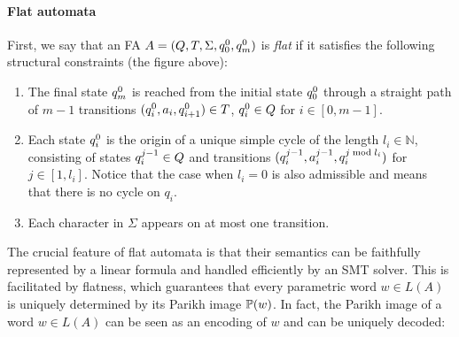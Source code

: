 \documentclass[sigplan,review,anonymous]{acmart}\settopmatter{printfolios=true,printccs=false,printacmref=false}
\begin{document}
\paragraph{Flat automata} 
First, we say that an FA 
$A = (Q,T,\Sigma,q_{0}^{0},q_{m}^{0})$ is \emph{flat} if it satisfies the following structural constraints (the figure above):
\begin{enumerate}
	\item The final state $q_{m}^{0}$ is reached from  the initial state $q_{0}^{0}$ through a straight path of $m-1$ transitions $(q_{i}^{0},a_i,q_{i+1}^{0}) \in T$, $q_{i}^{0} \in Q$ for $i\in[0,m-1]$. 
	\item  
Each state $q_{i}^{0}$ is the origin of a unique simple cycle of the length $l_i\in\mathbb{N}$, consisting of states $q_{i}^{j-1} \in Q$ and transitions $(q_{i}^{j-1}, a_{i}^{j-1}, q_{i}^{j \bmod l_i})$ for $j\in [1,l_i]$. 
Notice that the case when $l_i = 0$ is also admissible and means that there is no cycle on $q_i$.
	\item Each character in $\Sigma$ appears on at most one transition. 
\end{enumerate} 

The crucial feature of flat automata is that their semantics can be faithfully represented by a linear formula and handled efficiently by an SMT solver. 
%
This is facilitated by flatness, which guarantees that 
every parametric word $w\in L(A)$ is uniquely determined by its Parikh image $\mathbb{P}{(w)}$. 
In fact, the Parikh image of a word $w\in L(A)$ can be seen as an encoding of $w$ and can be uniquely decoded:
\end{document}
